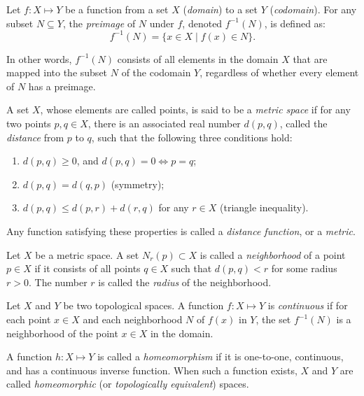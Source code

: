\begin{definition}[Preimage]
Let $f : X \mapsto Y$ be a function from a set $X$ (\emph{domain}) to a set $Y$ (\emph{codomain}). For any subset $N \subseteq Y$, the \emph{preimage} of $N$ under $f$, denoted $f^{-1}(N)$, is defined as:
\[
f^{-1}(N) = \{ x \in X \mid f(x) \in N \}.
\]
\end{definition}
In other words, $f^{-1}(N)$ consists of all elements in the domain $X$ that are mapped into the subset $N$ of the codomain $Y$, regardless of whether every element of $N$ has a preimage.

\begin{definition}
A set \( X \), whose elements are called points, is said to be a \emph{metric space} if for any two points \( p, q \in X \), there is an associated real number \( d(p, q) \), called the \emph{distance} from \( p \) to \( q \), such that the following three conditions hold:
\begin{enumerate}
    \item \( d(p, q) \geq 0 \), and \( d(p, q) = 0 \iff p = q \);
    \item \( d(p, q) = d(q, p) \) (symmetry);
    \item \( d(p, q) \leq d(p, r) + d(r, q) \) for any \( r \in X \) (triangle inequality).
\end{enumerate}
Any function satisfying these properties is called a \emph{distance function}, or a \emph{metric}.
\end{definition}

\begin{definition}[Neighborhood]
Let \( X \) be a metric space. A set \( N_r(p) \subset X \) is called a \emph{neighborhood} of a point \( p \in X \) if it consists of all points \( q \in X \) such that \( d(p, q) < r \) for some radius \( r > 0 \). The number \( r \) is called the \emph{radius} of the neighborhood.
\end{definition}


\begin{definition}[Continuous]
Let $X$ and $Y$ be two topological spaces. A function $f : X \mapsto Y$ is \emph{continuous} if for each point $x \in X$ and each neighborhood $N$ of $f(x)$ in $Y$, the set $f^{-1}(N)$ is a neighborhood of the point $x \in X$ in the domain.
\end{definition}

\begin{definition}
A function $h : X \mapsto Y$ is called a \emph{homeomorphism} if it is one-to-one, continuous, and has a continuous inverse function. When such a function exists, $X$ and $Y$ are called \emph{homeomorphic} (or \emph{topologically equivalent}) spaces.
\end{definition}

